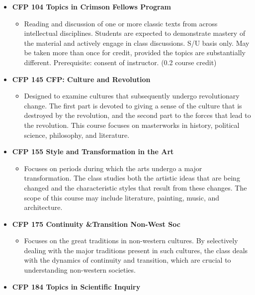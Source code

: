 \documentclass[
  letterpaper,
]{scrbook}
\providecommand{\tightlist}{%
  \setlength{\itemsep}{0pt}\setlength{\parskip}{0pt}}
\begin{document}
\begin{itemize}
\tightlist
\item
  \textbf{CFP 104 Topics in Crimson Fellows Program}

  \begin{itemize}
  \tightlist
  \item
    Reading and discussion of one or more classic texts from across
    intellectual disciplines. Students are expected to demonstrate
    mastery of the material and actively engage in class discussions.
    S/U basis only. May be taken more than once for credit, provided the
    topics are substantially different. Prerequisite: consent of
    instructor. (0.2 course credit)
  \end{itemize}
\item
  \textbf{CFP 145 CFP: Culture and Revolution}

  \begin{itemize}
  \tightlist
  \item
    Designed to examine cultures that subsequently undergo revolutionary
    change. The first part is devoted to giving a sense of the culture
    that is destroyed by the revolution, and the second part to the
    forces that lead to the revolution. This course focuses on
    masterworks in history, political science, philosophy, and
    literature.
  \end{itemize}
\item
  \textbf{CFP 155 Style and Transformation in the Art}

  \begin{itemize}
  \tightlist
  \item
    Focuses on periods during which the arts undergo a major
    transformation. The class studies both the artistic ideas that are
    being changed and the characteristic styles that result from these
    changes. The scope of this course may include literature, painting,
    music, and architecture.
  \end{itemize}
\item
  \textbf{CFP 175 Continuity \&Transition Non-West Soc}

  \begin{itemize}
  \tightlist
  \item
    Focuses on the great traditions in non-western cultures. By
    selectively dealing with the major traditions present in such
    cultures, the class deals with the dynamics of continuity and
    transition, which are crucial to understanding non-western
    societies.
  \end{itemize}
\item
  \textbf{CFP 184 Topics in Scientific Inquiry}


\end{itemize}
\end{document}
